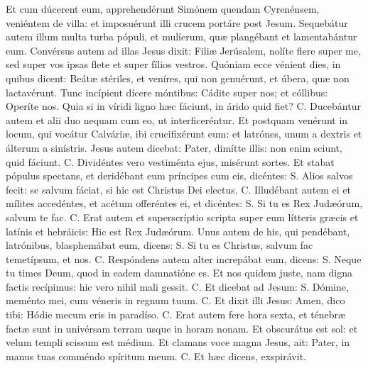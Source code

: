 \begin{paracol}{2}
{Et cum dúcerent eum, apprehendérunt Simónem quendam Cyrenénsem, veniéntem de villa: et imposuérunt illi crucem portáre post Jesum. Sequebátur autem illum multa turba pópuli, et mulíerum, quæ plangébant et lamentabántur eum. Convérsus autem ad illas Jesus dixit: \cruz Filiæ Jerúsalem, nolíte flere super me, sed super vos ipsas flete et super fílios vestros. Quóniam ecce vénient dies, in quibus dicent: Beátæ stériles, et veníres, qui non genuérunt, et úbera, quæ non lactavérunt. Tunc incípient dícere móntibus: Cádite super nos; et cóllibus: Operíte nos. Quia si in víridi ligno hæc fáciunt, in árido quid fiet? {\redx C.} Ducebántur autem et alii duo nequam cum eo, ut interficeréntur. Et postquam venérunt in locum, qui vocátur Calváriæ, ibi crucifixérunt eum: et latrónes, unum a dextris et álterum a sinístris. Jesus autem dicebat: \cruz Pater, dimítte illis: non enim sciunt, quid fáciunt. {\redx C.} Dividéntes vero vestiménta ejus, misérunt sortes. Et stabat pópulus spectans, et deridébant eum príncipes cum eis, dicéntes: {\redx S.} Alios salvos fecit: se salvum fáciat, si hic est Christus Dei electus. {\redx C.} Illudébant autem ei et mílites accedéntes, et acétum offeréntes ei, et dicéntes: {\redx S.} Si tu es Rex Judæórum, salvum te fac. {\redx C.} Erat autem et superscríptio scripta super eum lítteris græcis et latínis et hebráicis: Hic est Rex Judæórum. Unus autem de his, qui pendébant, latrónibus, blasphemábat eum, dicens: {\redx S.} Si tu es Christus, salvum fac temetípsum, et nos. {\redx C.} Respóndens autem alter increpábat eum, dicens: {\redx S.} Neque tu times Deum, quod in eadem damnatióne es. Et nos quidem juste, nam digna factis recípimus: hic vero nihil mali gessit. {\redx C.} Et dicebat ad Jesum: {\redx S.} Dómine, meménto mei, cum véneris in regnum tuum. {\redx C.} Et dixit illi Jesus: \cruz Amen, dico tibi: Hódie mecum eris in paradíso. {\redx C.} Erat autem fere hora sexta, et ténebræ factæ sunt in univérsam terram usque in horam nonam. Et obscurátus est sol: et velum templi scissum est médium. Et clamans voce magna Jesus, ait: \cruz Pater, in manus tuas comméndo spíritum meum. {\redx C.} Et hæc dicens, exspirávit.
}\switchcolumn\portugues{
}
\end{paracol}
